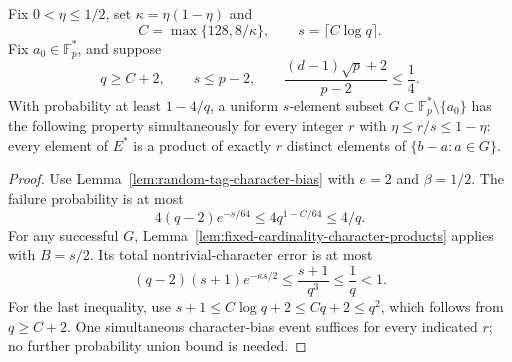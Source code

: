 \begin{corollary}\label{cor:logarithmic-tag-product-coverage}
Fix $0<\eta\le1/2$, set $\kappa=\eta(1-\eta)$ and
\[
 C=\max\{128,8/\kappa\},\qquad s=\lceil C\log q\rceil.
\]
Fix $a_0\in\mathbb F_p^*$, and suppose
\[
 q\ge C+2,\qquad s\le p-2,\qquad
 \frac{(d-1)\sqrt p+2}{p-2}\le\frac14.
\]
With probability at least $1-4/q$, a uniform $s$-element subset
$G\subset\mathbb F_p^*\setminus\{a_0\}$ has the following property
simultaneously for every integer $r$ with $\eta\le r/s\le1-\eta$:
every element of $E^*$ is a product of exactly $r$ distinct elements of
$\{b-a:a\in G\}$.
\end{corollary}
\begin{proof}
Use Lemma~\ref{lem:random-tag-character-bias} with $e=2$ and
$\beta=1/2$.  The failure probability is at most
\[
 4(q-2)e^{-s/64}\le4q^{1-C/64}\le4/q.
\]
For any successful $G$, Lemma~\ref{lem:fixed-cardinality-character-products}
applies with $B=s/2$.  Its total nontrivial-character error is at most
\[
 (q-2)(s+1)e^{-\kappa s/2}
 \le\frac{s+1}{q^3}\le\frac1q<1.
\]
For the last inequality, use $s+1\le C\log q+2\le Cq+2\le q^2$,
which follows from $q\ge C+2$.
One simultaneous character-bias event suffices for every indicated $r$;
no further probability union bound is needed.
\end{proof}
